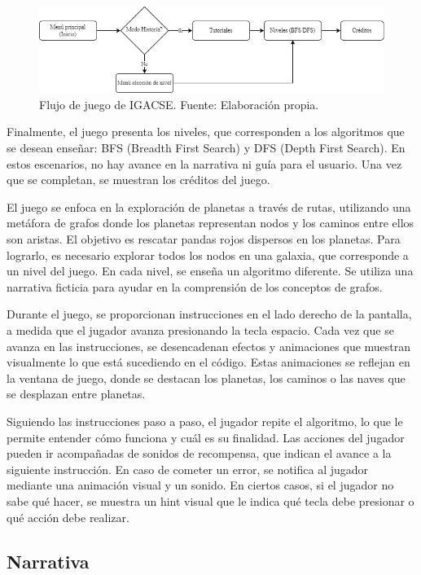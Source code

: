 \begin{figure}[h]
	\centering
	\includegraphics[scale=0.15]{imagenes/FlujoDeJuego.png}
	\caption{Flujo de juego de IGACSE. Fuente: Elaboración propia.}
	\label{FlujoDeJuego}
\end{figure}


Finalmente, el juego presenta los niveles, que corresponden a los algoritmos que se desean enseñar: BFS (Breadth First Search) y DFS (Depth First Search). En estos escenarios, no hay avance en la narrativa ni guía para el usuario. Una vez que se completan, se muestran los créditos del juego.

El juego se enfoca en la exploración de planetas a través de rutas, utilizando una metáfora de grafos donde los planetas representan nodos y los caminos entre ellos son aristas. El objetivo es rescatar pandas rojos dispersos en los planetas. Para lograrlo, es necesario explorar todos los nodos en una galaxia, que corresponde a un nivel del juego. En cada nivel, se enseña un algoritmo diferente. Se utiliza una narrativa ficticia para ayudar en la comprensión de los conceptos de grafos.

Durante el juego, se proporcionan instrucciones en el lado derecho de la pantalla, a medida que el jugador avanza presionando la tecla espacio. Cada vez que se avanza en las instrucciones, se desencadenan efectos y animaciones que muestran visualmente lo que está sucediendo en el código. Estas animaciones se reflejan en la ventana de juego, donde se destacan los planetas, los caminos o las naves que se desplazan entre planetas.

Siguiendo las instrucciones paso a paso, el jugador repite el algoritmo, lo que le permite entender cómo funciona y cuál es su finalidad. Las acciones del jugador pueden ir acompañadas de sonidos de recompensa, que indican el avance a la siguiente instrucción. En caso de cometer un error, se notifica al jugador mediante una animación visual y un sonido. En ciertos casos, si el jugador no sabe qué hacer, se muestra un hint visual que le indica qué tecla debe presionar o qué acción debe realizar.



\subsection{Narrativa}

